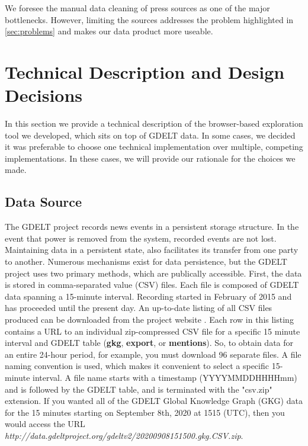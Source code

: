 \documentclass[preprint,authoryear,12pt]{elsarticle/elsarticle}
\begin{document}
We foresee the manual data cleaning of press sources as one of the major bottlenecks. However, limiting the sources addresses the problem highlighted in \ref{sec:problems} and makes our data product more useable. 

\section{Technical Description and Design Decisions}
\label{sec:tech}
In this section we provide a technical description of the browser-based exploration tool we developed, which sits on top of GDELT data. In some cases, we decided it was preferable to choose one technical implementation over multiple, competing implementations. In these cases, we will provide our rationale for the choices we made.

\subsection{Data Source}
The GDELT project records news events in a persistent storage structure. In the event that power is removed from the system, recorded events are not lost. Maintaining data in a persistent state, also facilitates its transfer from one party to another. Numerous mechanisms exist for data persistence, but the GDELT project uses two primary methods, which are publically accessible.  First, the data is stored in comma-separated value (CSV) files. Each file is composed of GDELT data spanning a 15-minute interval. Recording started in February of 2015 and has proceeded until the present day. An up-to-date listing of all CSV files produced can be downloaded from the project website \citep{GDELTCSVLIST}. Each row in this listing contains a URL to an individual zip-compressed CSV file for a specific 15 minute interval and GDELT table (\textbf{gkg}, \textbf{export}, or \textbf{mentions}). So, to obtain data for an entire 24-hour period, for example, you must download 96 separate files. A file naming convention is used, which makes it convenient to select a specific 15-minute interval. A file name starts with a timestamp (YYYYMMDDHHHHmm) and is followed by the GDELT table, and is terminated with the "csv.zip" extension. If you wanted all of the GDELT Global Knowledge Graph (GKG) data for the 15 minutes starting on September 8th, 2020 at 1515 (UTC), then you would access the URL \emph{http://data.gdeltproject.org/gdeltv2/20200908151500.gkg.CSV.zip}. 
\end{document}
